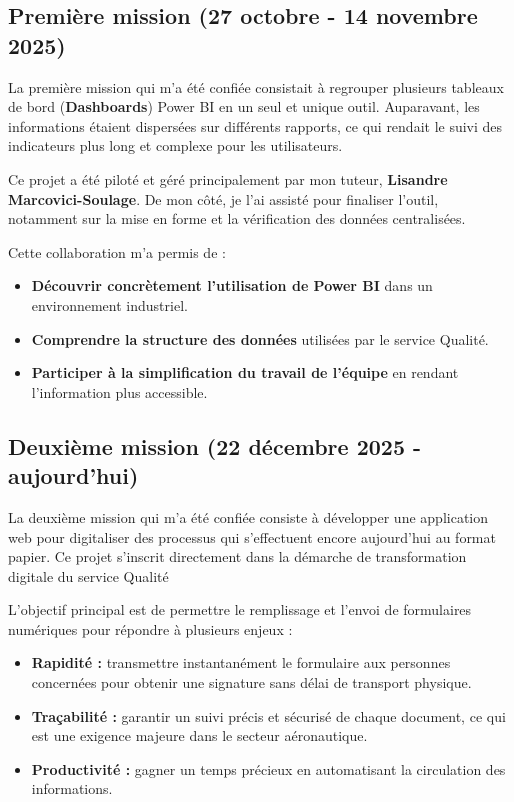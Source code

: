 \subsection*{Première mission (27 octobre - 14 novembre 2025)}
{}
La première mission qui m'a été confiée consistait à regrouper plusieurs tableaux de bord (\textbf{Dashboards}) Power BI en un seul et unique outil. Auparavant, les informations étaient dispersées sur différents rapports, ce qui rendait le suivi des indicateurs plus long et complexe pour les utilisateurs.

\noindent Ce projet a été piloté et géré principalement par mon tuteur, \textbf{Lisandre Marcovici-Soulage}. De mon côté, je l'ai assisté pour finaliser l'outil, notamment sur la mise en forme et la vérification des données centralisées.

\noindent Cette collaboration m'a permis de :
\begin{itemize}
  \item \textbf{Découvrir concrètement l'utilisation de Power BI} dans un environnement industriel.
  \item \textbf{Comprendre la structure des données} utilisées par le service Qualité.
  \item \textbf{Participer à la simplification du travail de l'équipe} en rendant l'information plus accessible.
\end{itemize}

\newpage

\subsection*{Deuxième mission (22 décembre 2025 - aujourd'hui)}
{}
La deuxième mission qui m’a été confiée consiste à développer une application web pour digitaliser des processus qui s'effectuent encore aujourd'hui au format papier. Ce projet s'inscrit directement dans la démarche de transformation digitale du service Qualité

\noindent L'objectif principal est de permettre le remplissage et l'envoi de formulaires numériques pour répondre à plusieurs enjeux :

\begin{itemize}
  \item \textbf{Rapidité :} transmettre instantanément le formulaire aux personnes concernées pour obtenir une signature sans délai de transport physique.
  \item \textbf{Traçabilité :} garantir un suivi précis et sécurisé de chaque document, ce qui est une exigence majeure dans le secteur aéronautique.
  \item \textbf{Productivité :} gagner un temps précieux en automatisant la circulation des informations.
\end{itemize}

